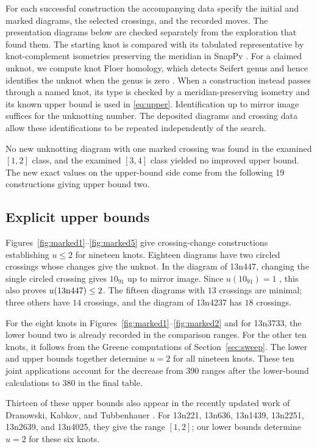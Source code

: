 \documentclass[12pt, oneside]{amsart}
\newcommand{\kn}[2]{\textup{#1#2}}
\newcommand{\nExactUpper}{19}
\newcommand{\nLowerImproved}{390}
\newcommand{\nImproved}{380}
\begin{document}
For each successful construction the accompanying data specify the initial and marked
diagrams, the selected crossings, and the recorded moves. The presentation diagrams below
are checked separately from the exploration that found them. The starting knot is compared
with its tabulated representative by knot-complement isometries preserving
the meridian in SnapPy \cite{SnapPy}. For a claimed unknot, we compute knot
Floer homology, which detects Seifert genus and hence identifies the unknot
when the genus is zero \cite{OSgenus}. When a construction instead passes
through a named knot, its type is checked by a meridian-preserving isometry
and its known upper bound is used in \eqref{eq:upper}.
Identification up to mirror image suffices for the unknotting number. The
deposited diagrams and crossing data allow these identifications to be
repeated independently of the search.

No new unknotting diagram with one marked crossing was found in the examined $[1,2]$ class, and the
examined $[3,4]$ class yielded no improved upper bound. The new exact values on the upper-bound side come
from the following \nExactUpper{} constructions giving upper bound two.

\subsection{Explicit upper bounds}\label{sec:eight}

Figures~\ref{fig:marked1}--\ref{fig:marked5} give crossing-change constructions
establishing $u\le2$ for nineteen knots. Eighteen diagrams have two circled
crossings whose changes give the unknot. In the diagram of \kn{13n}{447},
changing the single circled crossing gives $10_{91}$ up to mirror image.
Since $u(10_{91})=1$ \cite{KnotInfo}, this also proves $u(\kn{13n}{447})\le2$.
The fifteen diagrams with $13$ crossings are minimal; three others have
$14$ crossings, and the diagram of \kn{13n}{4237} has $18$ crossings.

For the eight knots in Figures~\ref{fig:marked1}--\ref{fig:marked2} and for
\kn{13n}{3733}, the lower bound two is already recorded in the comparison
ranges. For the other ten knots, it follows from the Greene computations
of Section~\ref{sec:sweep}. The lower and upper bounds together determine
$u=2$ for all nineteen knots. These ten joint applications account for the
decrease from \nLowerImproved{} ranges after the lower-bound calculations
to \nImproved{} in the final table.

Thirteen of these upper bounds also appear in the recently updated work of Dranowski,
Kabkov, and Tubbenhauer \cite[Table~1]{DKT}. For \kn{13n}{221},
\kn{13n}{636}, \kn{13n}{1439}, \kn{13n}{2251}, \kn{13n}{2639}, and
\kn{13n}{4025}, they give the range $[1,2]$; our lower bounds determine
$u=2$ for these six knots.
\end{document}
